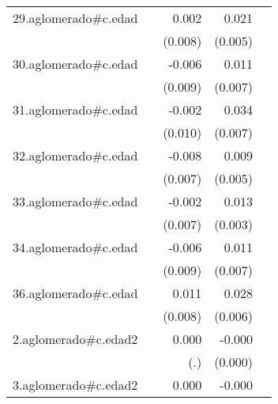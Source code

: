 {\begin{longtable}{l*{4}{D{.}{.}{-1}}}
\addlinespace
29.aglomerado#c.edad&                     &       0.002         &       0.021\sym{***}&                     \\
            &                     &     (0.008)         &     (0.005)         &                     \\
\addlinespace
30.aglomerado#c.edad&                     &      -0.006         &       0.011         &                     \\
            &                     &     (0.009)         &     (0.007)         &                     \\
\addlinespace
31.aglomerado#c.edad&                     &      -0.002         &       0.034\sym{***}&                     \\
            &                     &     (0.010)         &     (0.007)         &                     \\
\addlinespace
32.aglomerado#c.edad&                     &      -0.008         &       0.009\sym{*}  &                     \\
            &                     &     (0.007)         &     (0.005)         &                     \\
\addlinespace
33.aglomerado#c.edad&                     &      -0.002         &       0.013\sym{***}&                     \\
            &                     &     (0.007)         &     (0.003)         &                     \\
\addlinespace
34.aglomerado#c.edad&                     &      -0.006         &       0.011         &                     \\
            &                     &     (0.009)         &     (0.007)         &                     \\
\addlinespace
36.aglomerado#c.edad&                     &       0.011         &       0.028\sym{***}&                     \\
            &                     &     (0.008)         &     (0.006)         &                     \\
\addlinespace
2.aglomerado#c.edad2&                     &       0.000         &      -0.000         &                     \\
            &                     &         (.)         &     (0.000)         &                     \\
\addlinespace
3.aglomerado#c.edad2&                     &       0.000         &      -0.000         &                     \\

\end{longtable}}
